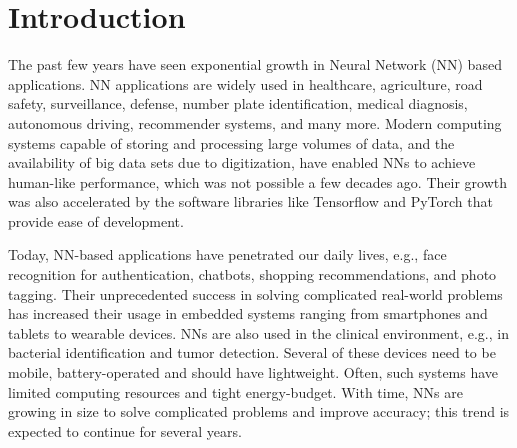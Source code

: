 \graphicspath{{./Ch1-Introduction/images/}}

\chapter{Introduction} \label{chap:introduction}
\begin{comment}
//clearly come out what are you doing in this thesis and what are the contributions
//what field you are targetting, scope and motivation, what problems, to justify your contributions.
1. About AI/ML/NN/DNNs: Applications, Domains, Growth, Type of NNs, Training and inference, 

2. Modern DNNs, architectures and popular NNs

3. Example: Number of computations, parameters: Illustrate compute and memory intensive operations.
Number of layer

4. Edge vs. Cloud Computing. 

5. Edge AI Challenges

6. About the Architectures for Edge AI Accelerators: Give wider scope of these architectures, and specific type of architectures. Trade-offs.

7. Performance bottlenecks for edge AI: Memory and Throughput bottlenecks.
Memory accesses are the key botllenecks for these edge AI devices. 

6. Summary and Outline of the Thesis.

\end{comment}

The past few years have seen exponential growth in Neural Network (NN) based applications. NN applications are widely used in healthcare, agriculture, road safety, surveillance, defense, number plate identification, medical diagnosis, autonomous driving, recommender systems, and many more. Modern computing systems capable of storing and processing large volumes of data, and the availability of big data sets due to digitization, have enabled NNs to achieve human-like performance, which was not possible a few decades ago. Their growth was also accelerated by the software libraries like Tensorflow and PyTorch that provide ease of development. 

Today, NN-based applications have penetrated our daily lives, e.g., face recognition for authentication, chatbots, shopping recommendations, and photo tagging. Their unprecedented success in solving complicated real-world problems has increased their usage in embedded systems ranging from smartphones and tablets to wearable devices. NNs are also used in the clinical environment, e.g., in bacterial identification and tumor detection. Several of these devices need to be mobile, battery-operated and should have lightweight. Often, such systems have limited computing resources and tight energy-budget. With time, NNs are growing in size to solve complicated problems and improve accuracy; this trend is expected to continue for several years. 

